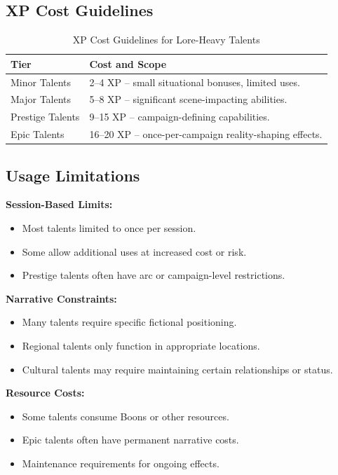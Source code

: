 \subsection{XP Cost Guidelines}\label{subsec:xp_guidelines}

\begin{longtable}{p{4cm} p{9cm}}
\caption{XP Cost Guidelines for Lore-Heavy Talents}\label{tab:lore_xp_costs}\\
\toprule
\textbf{Tier} & \textbf{Cost and Scope} \\
\midrule
Minor Talents & 2--4 XP -- small situational bonuses, limited uses. \\
Major Talents & 5--8 XP -- significant scene-impacting abilities. \\
Prestige Talents & 9--15 XP -- campaign-defining capabilities. \\
Epic Talents & 16--20 XP -- once-per-campaign reality-shaping effects. \\
\bottomrule
\end{longtable}

\subsection{Usage Limitations}\label{subsec:usage_limitations}

\textbf{Session-Based Limits:}
\begin{itemize}
    \item Most talents limited to once per session.
    \item Some allow additional uses at increased cost or risk.
    \item Prestige talents often have arc or campaign-level restrictions.
\end{itemize}

\textbf{Narrative Constraints:}
\begin{itemize}
    \item Many talents require specific fictional positioning.
    \item Regional talents only function in appropriate locations.
    \item Cultural talents may require maintaining certain relationships or status.
\end{itemize}

\textbf{Resource Costs:}
\begin{itemize}
    \item Some talents consume Boons or other resources.
    \item Epic talents often have permanent narrative costs.
    \item Maintenance requirements for ongoing effects.
\end{itemize}

